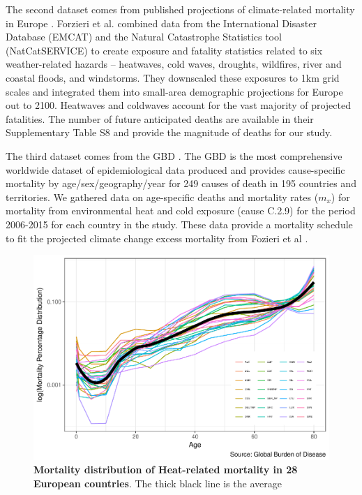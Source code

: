 \documentclass[12pt,]{article}
\makeatletter
\def\maxwidth{\ifdim\Gin@nat@width>\linewidth\linewidth
\else\Gin@nat@width\fi}
\let\Oldincludegraphics\includegraphics
\renewcommand{\includegraphics}[1]{\Oldincludegraphics[width=\maxwidth]{#1}}
\makeatother
\begin{document}
The second dataset comes from published projections of climate-related
mortality in Europe \citep{forzieri2017increasing}. Forzieri et al.
\citep{forzieri2017increasing} combined data from the International
Disaster Database (EMCAT) and the Natural Catastrophe Statistics tool
(NatCatSERVICE) to create exposure and fatality statistics related to
six weather-related hazards -- heatwaves, cold waves, droughts,
wildfires, river and coastal floods, and windstorms. They downscaled
these exposures to 1km grid scales and integrated them into small-area
demographic projections for Europe out to 2100. Heatwaves and coldwaves
account for the vast majority of projected fatalities. The number of
future anticipated deaths are available in their Supplementary Table S8
\citep{forzieri2017increasing} and provide the magnitude of deaths for
our study.

The third dataset comes from the GBD \citep{GBD, wang2012age}. The GBD
is the most comprehensive worldwide dataset of epidemiological data
produced and provides cause-specific mortality by age/sex/geography/year
for 249 causes of death in 195 countries and territories. We gathered
data on age-specific deaths and mortality rates (\(m_x\)) for mortality
from environmental heat and cold exposure (cause C.2.9) for the period
2006-2015 for each country in the study. These data provide a mortality
schedule to fit the projected climate change excess mortality from
Fozieri et al \citep{forzieri2017increasing}.

\begin{figure}
\centering
\includegraphics{MS-cclifeexpec_files/figure-latex/suppfig-1.pdf}
\caption{\textbf{Mortality distribution of Heat-related mortality in 28
European countries}. The thick black line is the average\label{suppfig}}
\end{figure}
\end{document}
